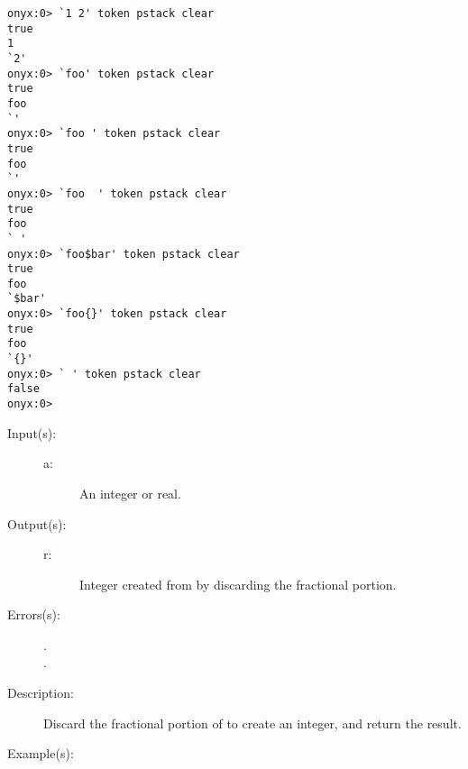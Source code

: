\begin{description}
\begin{description}
\begin{verbatim}
onyx:0> `1 2' token pstack clear
true
1
`2'
onyx:0> `foo' token pstack clear
true
foo
`'
onyx:0> `foo ' token pstack clear
true
foo
`'
onyx:0> `foo  ' token pstack clear
true
foo
` '
onyx:0> `foo$bar' token pstack clear
true
foo
`$bar'
onyx:0> `foo{}' token pstack clear
true
foo
`{}'
onyx:0> ` ' token pstack clear
false
onyx:0>
		\end{verbatim}
	\end{description}
\label{systemdict:trunc}
\item[{\onyxop{a}{trunc}{r}}: ]
	\begin{description}\item[]
	\item[Input(s): ]
		\begin{description}\item[]
		\item[a: ]
			An integer or real.
		\end{description}
	\item[Output(s): ]
		\begin{description}\item[]
		\item[r: ]
			Integer created from  by discarding the
			fractional portion.
		\end{description}
	\item[Errors(s): ]
		\begin{description}\item[]
		\item[.]
		\item[.]
		\end{description}
	\item[Description: ]
		Discard the fractional portion of  to create an
		integer, and return the result.
	\item[Example(s): ]\begin{verbatim}


\end{verbatim}
\end{description}
\end{description}
